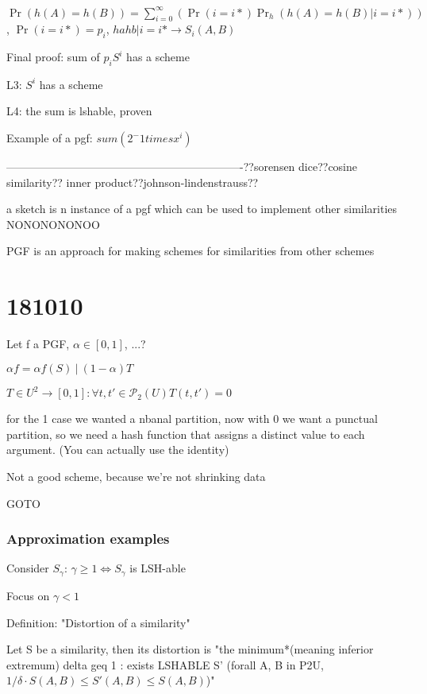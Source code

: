\documentclass{report}
\begin{document}
	$\Pr(h(A)=h(B))=\sum_{i=0}^{\infty}(\Pr(i=i*)\Pr_h(h(A)=h(B) | i=i*))$, $\Pr(i=i*) = p_i$, $hahb|i=i* \to S_i(A, B)$
	
	
	Final proof: sum of $p_iS^i$ has a scheme
	
	L3: $S^i$ has a scheme
	
	L4: the sum is lshable, proven
	
	
	Example of a pgf: $sum(2^-1 times x^i)$
	
	
	----------------------------------------------------------------??sorensen dice??cosine similarity?? inner product??johnson-lindenstrauss??
	
	a sketch is n instance of a pgf which can be used to implement other similarities NONONONONOO
	
	
	
	PGF is an approach for making schemes for similarities from other schemes
	
	\section{181010}
	
	Let f a PGF, $\alpha \in [0, 1]$, ...?
	
	$\alpha f = \alpha f(S)\ |\ (1 - \alpha)T$
	
	$T \in U^2 \to [0, 1] : \forall {t, t'} \in \mathcal{P}_2(U) T(t, t') = 0$
	
	for the 1 case we wanted a nbanal partition, now with 0 we want a punctual partition, so we need a hash function that assigns a distinct value to each argument. (You can actually use the identity)
	
	Not a good scheme, because we're not shrinking data
	
	GOTO %
	
	\subsubsection{Approximation examples}
	
	Consider $S_\gamma$: $\gamma \geq 1 \Leftrightarrow S_\gamma$ is LSH-able
	
	Focus on $\gamma < 1$
	
	Definition: "Distortion of a similarity"
	
	Let S be a similarity, then its distortion is "the minimum*(meaning inferior extremum) delta geq 1 : exists LSHABLE S' (forall {A, B} in P2U, $1/\delta \cdot S(A, B) \leq S'(A, B) \leq S(A, B)$)"
	
\end{document}
